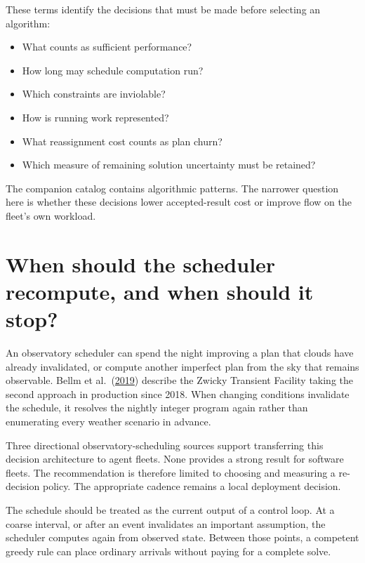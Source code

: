 
These terms identify the decisions that must be made before selecting an algorithm:

\begin{itemize}
\tightlist
\item
  What counts as sufficient performance?
\item
  How long may schedule computation run?
\item
  Which constraints are inviolable?
\item
  How is running work represented?
\item
  What reassignment cost counts as plan churn?
\item
  Which measure of remaining solution uncertainty must be retained?
\end{itemize}

The companion catalog contains algorithmic patterns. The narrower question here is whether these decisions lower accepted-result cost or improve flow on the fleet's own workload.

\hypertarget{when-should-the-scheduler-recompute-and-when-should-it-stop}{%
\section{When should the scheduler recompute, and when should it stop?}\label{when-should-the-scheduler-recompute-and-when-should-it-stop}}

An observatory scheduler can spend the night improving a plan that clouds have already invalidated, or compute another imperfect plan from the sky that remains observable. Bellm et al.~(\href{https://arxiv.org/abs/1905.02209}{2019}) describe the Zwicky Transient Facility taking the second approach in production since 2018. When changing conditions invalidate the schedule, it resolves the nightly integer program again rather than enumerating every weather scenario in advance.

Three directional observatory-scheduling sources support transferring this decision architecture to agent fleets. None provides a strong result for software fleets. The recommendation is therefore limited to choosing and measuring a re-decision policy. The appropriate cadence remains a local deployment decision.

The schedule should be treated as the current output of a control loop. At a coarse interval, or after an event invalidates an important assumption, the scheduler computes again from observed state. Between those points, a competent greedy rule can place ordinary arrivals without paying for a complete solve.

